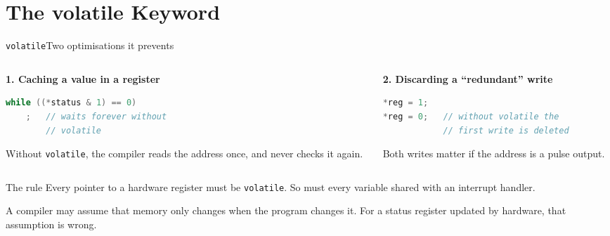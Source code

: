 \documentclass[9pt,aspectratio=169,xcolor=table]{beamer}
\begin{document}
\section{The volatile Keyword}

\begin{frame}[fragile]{\texttt{volatile}}{Two optimisations it prevents}
    \begin{columns}[T]
    \begin{column}{.5\textwidth}
        \textbf{1. Caching a value in a register}

        \vspace{1mm}
\begin{lstlisting}[language=C, basicstyle=\ttfamily\footnotesize]
while ((*status & 1) == 0)
    ;   // waits forever without
        // volatile
\end{lstlisting}

        \vspace{2mm}
        {\small Without \texttt{volatile}, the compiler reads the
        address once, and never checks it again.}
    \end{column}
    \begin{column}{.46\textwidth}
        \textbf{2. Discarding a ``redundant'' write}

        \vspace{1mm}
\begin{lstlisting}[language=C, basicstyle=\ttfamily\footnotesize]
*reg = 1;
*reg = 0;   // without volatile the
            // first write is deleted
\end{lstlisting}

        \vspace{2mm}
        {\small Both writes matter if the address is a \alert{pulse
        output}.}
    \end{column}
    \end{columns}

    \vspace{3mm}
    \begin{block}{The rule}
        \alert{Every pointer to a hardware register must be
        \texttt{volatile}. So must every variable shared with an
        interrupt handler.}

        \vspace{1mm}
        A compiler may assume that memory only changes when the
        program changes it. For a status register updated by
        hardware, that assumption is wrong.
    \end{block}
\end{frame}
\end{document}
